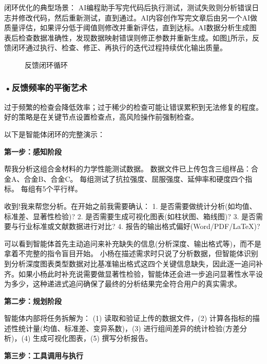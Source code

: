 闭环优化的典型场景：
AI编程助手写完代码后执行测试，测试失败则分析错误日志并修改代码，然后重新测试，直到通过。AI内容创作写完文章后由另一个AI做质量评估，如果评分低于阈值则修改并重新评估，直到达标。AI数据分析生成图表后检查数据准确性，发现数据映射错误则修正参数并重新生成。如图\ref{fig:ch3_3_27}所示，反馈闭环通过执行、检查、修正、再执行的迭代过程持续优化输出质量。

\begin{figure}[H]
\centering
{}
\caption{反馈闭环循环}
\label{fig:ch3_3_27}
\end{figure}


\subsubsection*{\textbf{•反馈频率的平衡艺术}}
过于频繁的检查会降低效率；过于稀少的检查可能让错误累积到无法修复的程度。好的策略是在关键节点设置检查点，高风险操作前强制检查。

 以下是智能体闭环的完整演示：

\textbf{第一步：感知阶段}

\begin{userbox}
帮我分析这组合金材料的力学性能测试数据。
数据文件已上传包含三组样品：合金A、合金B、合金C。
每组测试了抗拉强度、屈服强度、延伸率和硬度四个指标。
每组有5个平行样。
\end{userbox}

\begin{aibox}
收到!我来帮您分析。在开始之前我需要确认：
1. 是否需要做统计分析(如均值、标准差、显著性检验)?
2. 是否需要生成可视化图表(如柱状图、箱线图)?
3. 是否需要与行业标准或文献数据进行对比?
4. 报告的输出格式偏好(Word/PDF/LaTeX)?
\end{aibox}

可以看到智能体首先主动追问来补充缺失的信息(分析深度、输出格式等)，而不是拿着不完整的指令盲目开始。 小杨在描述需求时只说了分析数据，但智能体识别到分析深度图表类型数据对比基准输出格式这四个关键信息缺失，因此逐一追问补齐。如果小杨此时补充说需要做显著性检验，智能体还会进一步追问显著性水平设为多少，这种递进式追问确保了最终的分析结果完全符合用户的真实需求。

\textbf{第二步：规划阶段}

智能体内部将任务拆解为：
(1) 读取和验证上传的数据文件，(2) 计算各指标的描述性统计量(均值、标准差、变异系数)，(3) 进行组间差异的统计检验(方差分析)，(4) 生成可视化图表，(5) 撰写分析报告。

\textbf{第三步：工具调用与执行}

